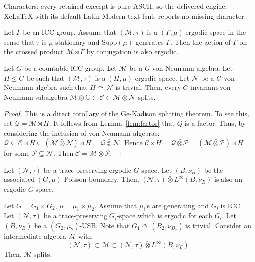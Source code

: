 \documentclass[10pt,a4paper]{amsart}
\begin{document}
Characters: every retained excerpt is pure ASCII, so the delivered engine, XeLaTeX with its default Latin Modern text font, reports no missing character.
\begin{lemma}
\label{lem:factor}
Let $\Gamma$ be an ICC group. Assume that $(\mathcal{M},\tau)$ is a $(\Gamma,\mu)$-ergodic space in the sense that $\tau$ is $\mu$-stationary and $\text{Supp}(\mu)$ generates $\Gamma$. Then the action of $
\Gamma$ on the crossed product $\mathcal{M}\rtimes\Gamma$ by conjugation is also ergodic.    
\end{lemma}

\begin{thm}
\label{thm:vnsplitting}
Let $G$ be a countable ICC group. Let $\mathcal{M}$ be a $G$-von Neumann algebra. Let $H\le G$ be such that $(\mathcal{M},\tau)$ is a $(H,\mu)$-ergodic space.  Let $\mathcal{N}$ be a $G$-von Neumann algebra such that $H\curvearrowright \mathcal{N}$ is trivial. Then, every $G$-invariant von Neumann subalgebra $\mathcal{M}\bar{\otimes} \mathbb{C}\subset\mathcal{C}\subset \mathcal{M}\bar{\otimes} \mathcal{N}$ splits. 
\begin{proof}
  This is a direct corollary of the Ge-Kadison splitting theorem. To see this, set $\mathcal{Q}=\mathcal{M}\rtimes H$. It follows from Lemma~\ref{lem:factor} that $Q$ is a factor. Thus, by considering the inclusion of von Neumann algebras: $\mathcal{Q}\subseteq \mathcal{C}\rtimes H\subseteq (\mathcal{M}\bar{\otimes} \mathcal{N})\rtimes H=\mathcal{Q}\bar{\otimes} \mathcal{N}$. Hence $\mathcal{C}\rtimes H=\mathcal{Q}\bar{\otimes} \mathcal{P}=(\mathcal{M}\bar{\otimes} \mathcal{P})\rtimes H$ for some $\mathcal{P}\subseteq \mathcal{N}$. Then $\mathcal{C}=\mathcal{M}\bar{\otimes} \mathcal{P}$.
\end{proof}
\end{thm}

\begin{lemma}
\label{lem:ergodic}
 Let $(\mathcal{N},\tau)$ be a trace-preserving ergodic $G$-space. Let $(B,\nu_B)$ be the associated $(G,\mu)$-Poisson boundary. Then, $(\mathcal{N},\tau)\bar{\otimes}L^{\infty}(B,\nu_B)$ is also an ergodic $G$-space.
\end{lemma}

\begin{thm}
\label{thm:genofBaderShalom}
Let $G=G_1\times G_2$, $\mu=\mu_1\times\mu_2$. Assume that $\mu_i$'s are generating and $G_i$ is ICC Let $(\mathcal{N},\tau)$ be a trace-preserving $G_i$-space which is ergodic for each $G_i$. Let $(B,\nu_B)$ be a $(G_2,\mu_2)$-USB. Note that $G_1\curvearrowright (B_2,\nu_{B_2})$ is trivial. Consider an intermediate algebra $\mathcal{M}$ with 
\[(\mathcal{N},\tau)\subset\mathcal{M}\subset(\mathcal{N},\tau)\bar{\otimes}L^{\infty}(B,\nu_B)\]
Then,
$\mathcal{M}$ splits. 
\end{thm}
\end{document}
